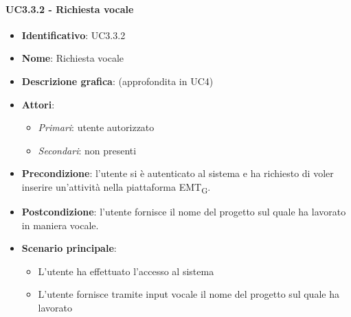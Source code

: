 \paragraph{UC3.3.2 - Richiesta vocale}
\begin{itemize}
   \item \textbf{Identificativo}: UC3.3.2
   \item \textbf{Nome}: Richiesta vocale
   \item \textbf{Descrizione grafica}: (approfondita in UC4)
   \item \textbf{Attori}:
   \begin{itemize} 
       \item \textit{Primari}: utente autorizzato
       \item \textit{Secondari}: non presenti
   \end{itemize}
       \item \textbf{Precondizione}: l'utente si è autenticato al sistema e ha richiesto di voler inserire un'attività nella piattaforma EMT\textsubscript{G}. 
       \item \textbf{Postcondizione}: l'utente fornisce il nome del progetto sul quale ha lavorato in maniera vocale.
    \item \textbf{Scenario principale}: 
       \begin{itemize}
           \item L'utente ha effettuato l'accesso al sistema 
           \item L'utente fornisce tramite input vocale il nome del progetto sul quale ha lavorato
       \end{itemize}
\end{itemize}

